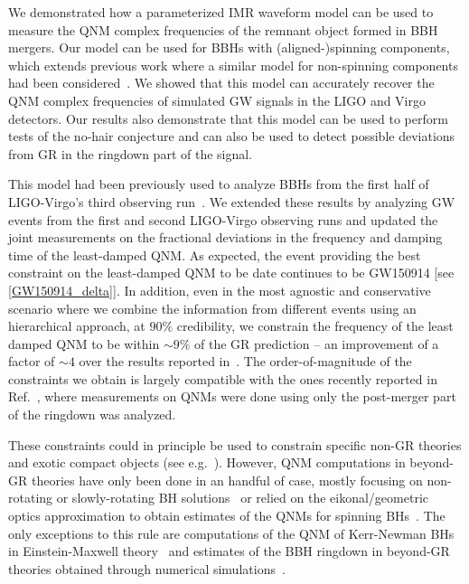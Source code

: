 We demonstrated how a parameterized IMR waveform model can be used to measure the QNM complex frequencies of the remnant object formed in BBH mergers. Our model can be used for BBHs with (aligned-)spinning components, which extends previous work where a similar model for non-spinning components had been considered~\cite{Brito:2018rfr}. We showed that this model can accurately recover the QNM complex frequencies of simulated GW signals in the LIGO and Virgo detectors. Our results also demonstrate that this model can be used to perform tests of the no-hair conjecture and can also be used to detect possible deviations from GR in the ringdown part of the signal.

This model had been previously used to analyze BBHs from the first half of LIGO-Virgo's third observing run~\cite{Abbott:2020jks}. We extended these results by analyzing GW events from the first and second LIGO-Virgo observing runs and updated the joint measurements on the fractional deviations in the frequency and damping time of the least-damped QNM. As expected, the event providing the best constraint on the least-damped QNM to be date continues to be GW150914 [see \eqref{GW150914_delta}]. In addition, even in the most agnostic and conservative scenario where we combine the information from different events using an hierarchical approach, at $90\%$ credibility, we constrain the frequency of the least damped QNM to be within $\sim 9\%$ of the GR prediction -- an improvement of a factor of $\sim 4$ over the results reported in~\cite{Abbott:2020jks}. The order-of-magnitude of the constraints we obtain is largely compatible with the ones recently reported in Ref.~\cite{Carullo:2021dui}, where measurements on QNMs were done using only the post-merger part of the ringdown was analyzed.

These constraints could in principle be used to constrain specific non-GR theories and exotic compact objects (see e.g.~\cite{Glampedakis:2017cgd,Cardoso:2019rvt,Maggio:2020jml}). However, QNM computations in beyond-GR theories have only been done in an handful of case, mostly focusing on non-rotating or slowly-rotating BH solutions~\cite{Ferrari:2000ep,Molina:2010fb,Pani:2009wy,Blazquez-Salcedo:2016enn,Blazquez-Salcedo:2017txk,Brito:2018hjh,Franciolini:2018uyq,Cardoso:2018ptl,Tattersall:2018nve,Tattersall:2019nmh,Blazquez-Salcedo:2019nwd,Silva:2019scu,Glampedakis:2019dqh,Blazquez-Salcedo:2020jee,Blazquez-Salcedo:2020caw,Cano:2020cao} or relied on the eikonal/geometric optics approximation to obtain estimates of the QNMs for spinning BHs~\cite{Blazquez-Salcedo:2016enn,Glampedakis:2017dvb,Jai-akson:2017ldo}. The only exceptions to this rule are computations of the QNM of Kerr-Newman BHs in Einstein-Maxwell theory~\cite{Pani:2013ija,Pani:2013wsa,Mark:2014aja,Dias:2015wqa} and estimates of the BBH ringdown in beyond-GR theories obtained through numerical simulations~\cite{Okounkova:2019dfo,Okounkova:2019zjf}.

